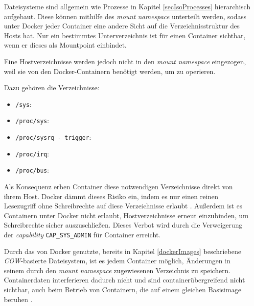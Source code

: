 \documentclass[../main.tex]{subfiles}
\begin{document}
			Dateisysteme sind allgemein wie Prozesse in Kapitel \ref{secIsoProcesses} hierarchisch aufgebaut. Diese können mithilfe des \emph{mount namespace} unterteilt werden, sodass unter Docker jeder Container eine andere Sicht auf die Verzeichnisstruktur des Hosts hat. Nur ein bestimmtes Unterverzeichnis ist für einen Container sichtbar, wenn er dieses als Mountpoint einbindet.

			Eine Hostverzeichnisse werden jedoch nicht in den \emph{mount namespace} eingezogen, weil sie von den Docker-Containern benötigt werden, um zu operieren.

			Dazu gehören die Verzeichnisse:

			\begin{itemize}
				\item \texttt{/sys}:
				\item \texttt{/proc/sys}:
				\item \texttt{/proc/sysrq - trigger}:
				\item \texttt{/proc/irq}:
				\item \texttt{/proc/bus}:
			\end{itemize}

			Als Konsequenz erben Container diese notwendigen Verzeichnisse direkt von ihrem Host. Docker dämmt dieses Risiko ein, indem es nur einen reinen Lesezugriff ohne Schreibrechte auf diese Verzeichnisse erlaubt \cite[S.4]{dockerSecIntro}. Außerdem ist es Containern unter Docker nicht erlaubt, Hostverzeichnisse erneut einzubinden, um Schreibrechte sicher auszuschließen. Dieses Verbot wird durch die Verweigerung der \emph{capability} \texttt{CAP\_SYS\_ADMIN} für Container erreicht.

			Durch das von Docker genutzte, bereits in Kapitel \ref{dockerImages} beschriebene \emph{\acrshort{COW}}-basierte Dateisystem, ist es jedem Container möglich, Änderungen in seinem durch den \emph{mount namespace} zugewiesenen Verzeichnis zu speichern. Containerdaten interferieren dadurch nicht und sind containerübergreifend nicht sichtbar, auch beim Betrieb von Containern, die auf einem gleichen Basisimage beruhen \cite[S.4]{dockerSecIntro}.



\end{document}
